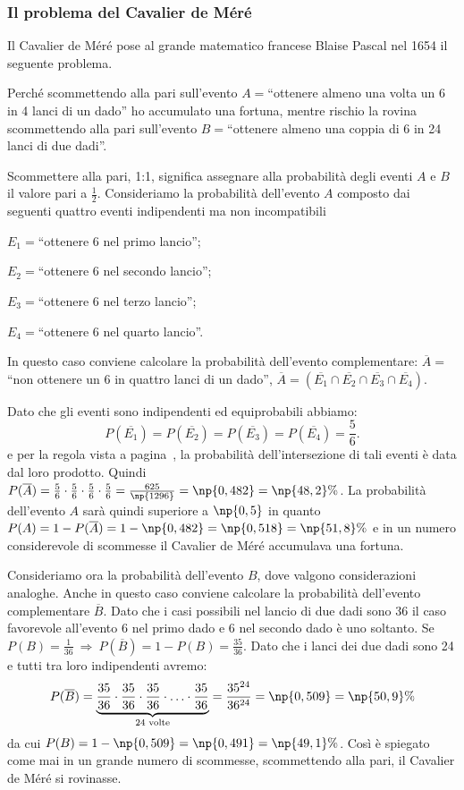 \subsubsection*{Il problema del Cavalier de Méré}

Il Cavalier de Méré pose al grande matematico francese Blaise Pascal nel 1654 il seguente problema.
\begin{problema}
Perché scommettendo alla pari sull'evento $A=$``ottenere almeno una volta un 6 in 4 lanci di un dado'' ho accumulato una fortuna, mentre rischio la rovina scommettendo alla pari sull'evento $B=$``ottenere almeno una coppia di 6 in 24 lanci di due dadi''.
\end{problema}
Scommettere alla pari, 1:1, significa assegnare alla probabilità degli eventi $A$ e $B$ il valore pari a $\frac 1 2$.
Consideriamo la probabilità dell'evento $A$ composto dai seguenti quattro eventi indipendenti ma non incompatibili
\begin{multicols}{2}
\begin{description*}
\item $E_1=$``ottenere 6 nel primo lancio'';
\item $E_2=$``ottenere 6 nel secondo lancio'';
\item $E_3=$``ottenere 6 nel terzo lancio'';
\item $E_4=$``ottenere 6 nel quarto lancio''.
\end{description*}
\end{multicols}
In questo caso conviene calcolare la probabilità dell'evento complementare: $\overline A=$``non ottenere un 6 in quattro lanci di un dado'', $\overline A=(\overline{E_1}\cap \overline{E_2}\cap \overline{E_3}\cap \overline{E_4})$.

Dato che gli eventi sono indipendenti ed equiprobabili abbiamo: \[ P(\overline{E_1})=P(\overline{E_2})=P(\overline{E_3})=P(\overline{E_4})=\frac 5 6. \]
e per la regola vista a pagina~\pageref{reg:probabilita_intersezione_eventi_indipendenti}, la probabilità dell'intersezione di tali eventi è data dal loro prodotto. Quindi $P(\overline A)=\frac 5 6\cdot \frac 5 6\cdot \frac 5 6\cdot \frac 5 6=\frac{625}{\np{1296}}=\np{0,482}=\np{48,2}\%$.
La probabilità dell'evento $A$ sarà quindi superiore a $\np{0,5}$ in quanto $P(A)=1-P(\overline A)=1-\np{0,482}=\np{0,518}=\np{51,8}\%$ e in un numero considerevole di scommesse il Cavalier de Méré accumulava una fortuna.

Consideriamo ora la probabilità dell'evento $B$, dove valgono considerazioni analoghe. Anche in questo caso conviene calcolare la probabilità dell'evento complementare $\overline B$. Dato che i casi possibili nel lancio di due dadi sono 36 il caso favorevole all'evento 6 nel primo dado e 6 nel secondo dado è uno soltanto. Se $P(B)=\frac 1{36} \:\Rightarrow\: P(\overline B)=1-P(B)=\frac{35}{36}$. Dato che i lanci dei due dadi sono 24 e tutti tra loro indipendenti avremo:
\[ P(\overline B)=\underbrace{\frac{35}{36}\cdot\frac{35}{36}\cdot\frac{35}{36}\cdot\ldots\cdot\frac{35}{36}}_{24\text{ volte}}=\frac{35^{24}}{36^{24}}=\np{0,509}=\np{50,9}\% \]
da cui $P(B)=1-\np{0,509}=\np{0,491}=\np{49,1}\%$. Così è spiegato come mai in un grande numero di scommesse, scommettendo alla pari, il Cavalier de Méré si rovinasse.

